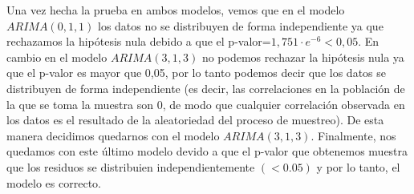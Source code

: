 \documentclass[a4paper,]{article}
\begin{document}
Una vez hecha la prueba en ambos modelos, vemos que en el modelo $ARIMA(0,1,1)$ los datos no se distribuyen de forma independiente ya que rechazamos la hipótesis nula debido a que el p-valor=$1,751 \cdot e^{-6}<0,05$. En cambio en el modelo $ARIMA(3,1,3)$ no podemos rechazar la hipótesis nula ya que el p-valor es mayor que 0,05, por lo tanto podemos decir que los datos se distribuyen de forma independiente (es decir, las correlaciones en la población de la que se toma la muestra son 0, de modo que cualquier correlación observada en los datos es el resultado de la aleatoriedad del proceso de muestreo). De esta manera decidimos quedarnos con el modelo $ARIMA(3,1,3)$. Finalmente, nos quedamos con este último modelo devido a que el p-valor que obtenemos muestra que los residuos se distribuien independientemente $(<0.05)$ y por lo tanto, el modelo es correcto.
\end{document}
